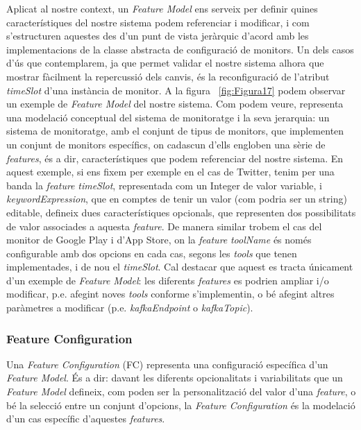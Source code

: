 Aplicat al nostre context, un \textit{Feature Model} ens serveix per definir quines característiques del nostre sistema podem referenciar i modificar, i com s'estructuren aquestes des d'un punt de vista jeràrquic d'acord amb les implementacions de la classe abstracta de configuració de monitors. Un dels casos d'ús que contemplarem, ja que permet validar el nostre sistema alhora que mostrar fàcilment la repercussió dels canvis, és la reconfiguració de l'atribut \textit{timeSlot} d'una instància de monitor. A la figura ~\ref{fig:Figura17} podem observar un exemple de \textit{Feature Model} del nostre sistema. Com podem veure, representa una modelació conceptual del sistema de monitoratge i la seva jerarquia: un sistema de monitoratge, amb el conjunt de tipus de monitors, que implementen un conjunt de monitors específics, on cadascun d'ells engloben una sèrie de \textit{features}, és a dir, característiques que podem referenciar del nostre sistema. En aquest exemple, si ens fixem per exemple en el cas de Twitter, tenim per una banda la \textit{feature} \textit{timeSlot}, representada com un Integer de valor variable, i \textit{keywordExpression}, que en comptes de tenir un valor (com podria ser un string) editable, defineix dues característiques opcionals, que representen dos possibilitats de valor associades a aquesta \textit{feature}. De manera similar trobem el cas del monitor de Google Play i d'App Store, on la \textit{feature} \textit{toolName} és només configurable amb dos opcions en cada cas, segons les \textit{tools} que tenen implementades, i de nou el \textit{timeSlot}. Cal destacar que aquest es tracta únicament d'un exemple de \textit{Feature Model}: les diferents \textit{features} es podrien ampliar i/o modificar, p.e. afegint noves \textit{tools} conforme s'implementin, o bé afegint altres paràmetres a modificar (p.e. \textit{kafkaEndpoint} o \textit{kafkaTopic}).

\subsubsection{Feature Configuration}

Una \textit{Feature Configuration} (FC) representa una configuració específica d'un \textit{Feature Model}. És a dir: davant les diferents opcionalitats i variabilitats que un \textit{Feature Model} defineix, com poden ser la personalització del valor d'una \textit{feature}, o bé la selecció entre un conjunt d'opcions, la \textit{Feature Configuration} és la modelació d'un cas específic d'aquestes \textit{features}.\\


